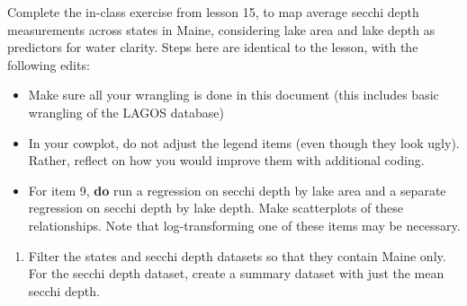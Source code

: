 \documentclass[]{article}
\providecommand{\tightlist}{%
  \setlength{\itemsep}{0pt}\setlength{\parskip}{0pt}}
\begin{document}
Complete the in-class exercise from lesson 15, to map average secchi
depth measurements across states in Maine, considering lake area and
lake depth as predictors for water clarity. Steps here are identical to
the lesson, with the following edits:

\begin{itemize}
\tightlist
\item
  Make sure all your wrangling is done in this document (this includes
  basic wrangling of the LAGOS database)
\item
  In your cowplot, do not adjust the legend items (even though they look
  ugly). Rather, reflect on how you would improve them with additional
  coding.
\item
  For item 9, \textbf{do} run a regression on secchi depth by lake area
  and a separate regression on secchi depth by lake depth. Make
  scatterplots of these relationships. Note that log-transforming one of
  these items may be necessary.
\end{itemize}

\begin{enumerate}
\def\labelenumi{\arabic{enumi}.}
\setcounter{enumi}{4}
\tightlist
\item
  Filter the states and secchi depth datasets so that they contain Maine
  only. For the secchi depth dataset, create a summary dataset with just
  the mean secchi depth.
\end{enumerate}
\end{document}
